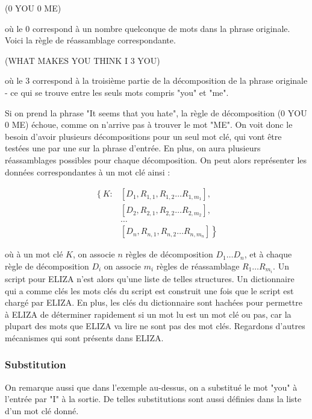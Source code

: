 \documentclass[11pt, a4paper]{report}
\begin{document}
  \begin{center}
    (0 YOU 0 ME)
  \end{center} 

  où le 0 correspond à un nombre quelconque de mots dans la phrase originale. 
  Voici la règle de réassamblage correspondante.

  \begin{center}
    (WHAT MAKES YOU THINK I 3 YOU)
  \end{center} 
  
  où le 3 correspond à la troisième partie de la décomposition de la phrase originale 
  - ce qui se trouve entre les seuls mots compris "you" et "me". 
   
  Si on prend la phrase "It seems that you hate", la règle de décomposition 
  (0 YOU 0 ME) échoue, comme on n'arrive pas à trouver le mot "ME". On voit donc le 
  besoin d'avoir plusieurs décompositions pour un seul mot clé, qui vont être testées 
  une par une sur la phrase d'entrée. En plus, on aura plusieurs réassamblages possibles pour 
  chaque décomposition. On peut alors représenter les données correspondantes à un mot clé 
  ainsi : 

  \begin{align*}
    \left\{ K: \right. 
    &\left[ D_{1}, R_{1, 1}, R_{1, 2} \ldots R_{1, m_{1}} \right], \\
    &\left[ D_{2}, R_{2, 1}, R_{2, 2} \ldots R_{2, m_{2}} \right], \\
    &\ldots \\
    &\left. \left[ D_{n}, R_{n, 1}, R_{n, 2} \ldots R_{n, m_{n}} \right] \right\}
  \end{align*}

  où à un mot clé $K$, on associe $n$ règles de décomposition $D_{1} \ldots D_{n}$, et à 
  chaque règle de décomposition $D_{i}$ on associe $m_{i}$ règles de réassamblage 
  $R_{1} \ldots R_{m_{i}}$. Un script pour ELIZA 
  n'est alors qu'une liste de telles structures. Un dictionnaire qui a comme clés 
  les mots clés du script est construit une fois que le script est chargé par ELIZA. 
  En plus, les clés du dictionnaire sont hachées pour permettre à ELIZA de déterminer 
  rapidement si un mot lu est un mot clé ou pas, car la plupart des mots que ELIZA va lire 
  ne sont pas des mot clés. Regardons 
  d'autres mécanismes qui sont présents dans ELIZA.

  \subsubsection{Substitution}
  On remarque aussi que dans l'exemple au-dessus, on a substitué le mot "you" à l'entrée par "I"
  à la sortie. De telles substitutions sont aussi définies dans la liste d'un mot clé donné.  
  
\end{document}
